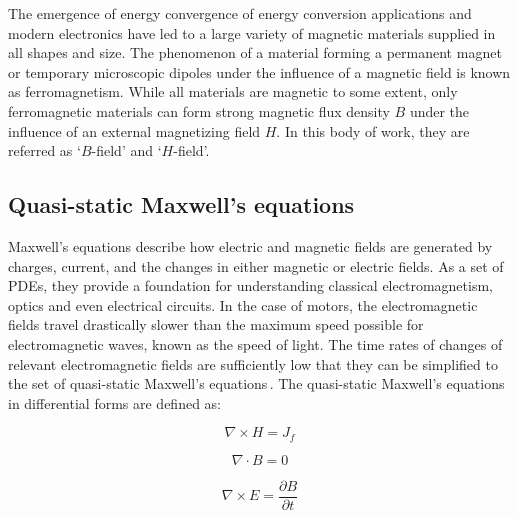     The emergence of energy convergence of energy conversion applications and modern electronics have led to a large variety of magnetic materials supplied in all shapes and size. The phenomenon of a material forming a permanent magnet or temporary microscopic dipoles under the influence of a magnetic field is known as ferromagnetism. While all materials are magnetic to some extent, only ferromagnetic materials can form strong magnetic flux density $B$ under the influence of an external magnetizing field $H$. In this body of work, they are referred as ‘$B$-field’ and ‘$H$-field’. 
    

    \subsection{Quasi-static Maxwell's equations}     \label{Chapter:background/electromagnetic field theory/quasi-static maxwell equations}
    
    
        Maxwell's equations describe how electric and magnetic fields are generated by charges, current, and the changes in either magnetic or electric fields. As a set of \acp{PDE}, they provide a foundation for understanding classical electromagnetism, optics and even electrical circuits. In the case of motors, the electromagnetic fields travel drastically slower than the maximum speed possible for electromagnetic waves, known as the speed of light. The time rates of changes of relevant electromagnetic fields are sufficiently low that they can be simplified to the set of quasi-static Maxwell's equations\,\cite{Melcher1981}. The quasi-static Maxwell's equations in differential forms are defined as:
    
    
        \begin{equation}
            \nabla \times H = J_f
            \label{eq:ampere's circuit law}
        \end{equation}
        
        \begin{equation}
            \nabla \cdot B = 0
            \label{eq:gauss's magnetism law}
        \end{equation}
        
        \begin{equation}
            \nabla \times E = \frac{\partial B}{\partial t}
            \label{eq:maxwell-faraday's law}
        \end{equation}
    

